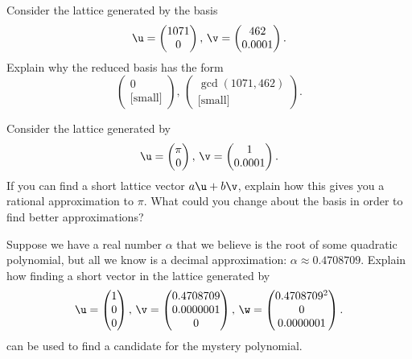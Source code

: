 \begin{explor}
	Consider the lattice generated by the basis
	\[\u=\begin{pmatrix}
	1071\\0
	\end{pmatrix},\,\v=\begin{pmatrix}
	462 \\ 0.0001
	\end{pmatrix}.\]
	Explain why the reduced basis has the form
	\[\begin{pmatrix}
	0\\\text{[small]}
	\end{pmatrix},\,\begin{pmatrix}
	\gcd(1071,462) \\ \text{[small]}
	\end{pmatrix}.\]
\end{explor}

\begin{explor}
	Consider the lattice generated by
	\[\u=\begin{pmatrix}
	\pi\\0
	\end{pmatrix},\,\v=\begin{pmatrix}
	1 \\ 0.0001
	\end{pmatrix}.\]
	If you can find a short lattice vector $a\u+b\v$, explain how this gives you a rational approximation to $\pi$. What could you change about the basis in order to find better approximations?
\end{explor}

\begin{explor}
	Suppose we have a real number $\alpha$ that we believe is the root of some quadratic polynomial, but all we know is a decimal approximation: $\alpha\approx 0.4708709$. Explain how finding a short vector in the lattice generated by
	\[\u=\begin{pmatrix}
	1\\0\\0
	\end{pmatrix},\,\v=\begin{pmatrix}
	0.4708709 \\ 0.0000001 \\ 0
	\end{pmatrix},\,\w=\begin{pmatrix}
	0.4708709^2 \\ 0\\ 0.0000001
	\end{pmatrix}.\]
	can be used to find a candidate for the mystery polynomial.
\end{explor}

